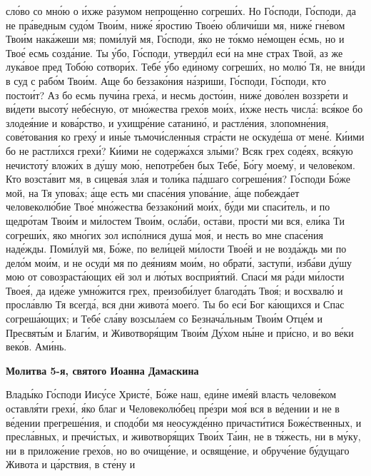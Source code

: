 сло́во со мно́ю о и́хже ра́зумом непроще́нно согреши́х. Но Го́споди,
Го́споди, да не пра́ведным судо́м Твои́м, ниже́ я́ростию Твое́ю обличи́ши
мя, ниже́ гне́вом Твои́м нака́жеши мя; поми́луй мя, Го́споди, я́ко
не то́кмо не́мощен е́смь, но и Твое́ есмь созда́ние. Ты у́бо, Го́споди,
утверди́л еси́ на мне страх Твой, аз же лука́вое пред Тобо́ю сотвори́х.
Тебе́ у́бо еди́ному согреши́х, но молю́ Тя, не вни́ди в суд с рабо́м
Твои́м. Аще бо беззако́ния на́зриши, Го́споди, Го́споди, кто постои́т?
Аз бо есмь пучи́на греха́, и несмь досто́ин, ниже́ дово́лен воззре́ти
и ви́дети высоту́ небе́сную, от мно́жества грехо́в мои́х, и́хже несть
числа́: вся́кое бо злодея́ние и кова́рство, и ухищре́ние сатанино́, и
растле́ния, злопомне́ния, сове́тования ко греху́ и ины́е тьмочи́сленныя
стра́сти не оскуде́ша от мене́. Ки́ими бо не растли́хся грехи́? Ки́ими не
содержа́хся злы́ми? Всяк грех соде́ях, вся́кую нечистоту́ вложи́х в ду́шу
мою́, непотре́бен бых Тебе́, Бо́гу моему́, и челове́ком. Кто возста́вит
мя, в сицева́я зла́я и толи́ка па́дшаго согреше́ния? Го́споди Бо́же
мой, на Тя упова́х; а́ще есть ми спасе́ния упова́ние, а́ще побежда́ет
человеколю́бие Твое́ мно́жества беззако́ний мои́х, бу́ди ми спаси́тель, и по
щедро́там Твои́м и ми́лостем Твои́м, осла́би, оста́ви, прости́ ми вся, ели́ка
Ти согреши́х, яко мно́гих зол испо́лнися душа́ моя́, и несть во мне
спасе́ния наде́жды. Поми́луй мя, Бо́же, по вели́цей ми́лости Твое́й и не
возда́ждь ми по дело́м мои́м, и не осуди́ мя по дея́ниям мои́м, но
обрати́, заступи́, изба́ви ду́шу мою от совозраста́ющих ей зол и лю́тых
восприя́тий. Спаси́ мя ра́ди ми́лости Твоея́, да иде́же умно́жится грех,
преизоби́лует благода́ть Твоя́; и восхвалю́ и просла́влю Тя всегда́, вся
дни живота́ моего́. Ты бо еси́ Бог ка́ющихся и Спас согреша́ющих; и
Тебе́ сла́ву возсыла́ем со Безнача́льным Твои́м Отце́м и Пресвяты́м и
Благи́м, и Животворя́щим Твои́м Ду́хом ны́не и при́сно, и во ве́ки веко́в.
Ами́нь.



 

\bfseries Молитва 5-я, святого Иоанна Дамаскина\normalfont{}


   Влады́ко Го́споди Иису́се Христе́, Бо́же наш, еди́не име́яй власть
челове́ком оставля́ти грехи́, я́ко благ и Человеколю́бец пре́зри моя́ вся
в ве́дении и не в ве́дении прегреше́ния, и сподо́би мя неосужде́нно
причасти́тися Боже́ственных, и пресла́вных, и пречи́стых, и животворя́щих
Твои́х Та́ин, не в тя́жесть, ни в му́ку, ни в приложе́ние грехо́в, но во
очище́ние, и освяще́ние, и обруче́ние бу́дущаго Живота и ца́рствия, в сте́ну и

